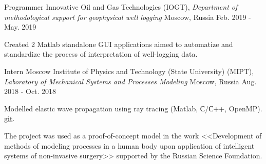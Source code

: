 \begin{cventries}

  \cventry
    {Programmer} %
    {Innovative Oil and Gas Technologies (IOGT), \newline \textit{Department of methodological support for geophysical well logging}} %
    {Moscow, Russia} %
    {Feb. 2019 - May. 2019} %
    {
      \begin{cvitems} %
        \item {Created 2 Matlab standalone GUI applications aimed to automatize and standardize the process of interpretation of well-logging data.}
      \end{cvitems}
    }


  \cventry
    {Intern} %
    {Moscow Institute of Physics and Technology (State University) (MIPT), \newline \textit{Laboratory of Mechanical Systems and Processes Modeling}} %
    {Moscow, Russia} %
    {Aug. 2018 - Oct. 2018} %
    {
      \begin{cvitems} %
        \item {Modelled elastic wave propagation using ray tracing (Matlab, С/С++, OpenMP). \href{https://github.com/PolyachenkoYA/geo}{git}.}
        \item {The project was used as a proof-of-concept model in the work <<Development of methods of modeling processes in a human body upon application of intelligent systems of non-invasive surgery>> supported by the Russian Science Foundation.}
      \end{cvitems}
    }

\end{cventries}
